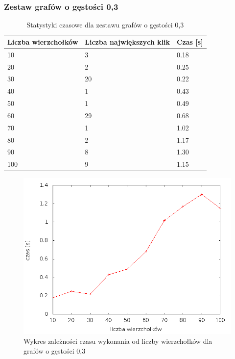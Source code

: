 \documentclass[12pt, a4paper]{article}
\begin{document}
\subsubsection*{Zestaw grafów o gęstości 0,3}
\begin{table}[H]
\caption{Statystyki czasowe dla zestawu grafów o gęstości 0,3}
\begin{center}
    \begin{tabular}{|l|l|l|}
    \hline
    Liczba wierzchołków & Liczba największych klik & Czas [s] \\ \hline
    10 & 3 & 0.18 \\ \hline
    20 & 2 & 0.25 \\ \hline
    30 & 20 & 0.22 \\ \hline
    40 & 1 & 0.43 \\ \hline
    50 & 1 & 0.49 \\ \hline
    60 & 29 & 0.68 \\ \hline
    70 & 1 & 1.02 \\ \hline
    80 & 2 & 1.17 \\ \hline
    90 & 8 & 1.30 \\ \hline
    100 & 9 & 1.15 \\ \hline
    \end{tabular}
\end{center}
\end{table}

\begin{figure}[h]
    \begin{center}
	\includegraphics[scale=0.5]{results/img/den/den_03.png}
	\caption{Wykres zależności czasu wykonania od liczby wierzchołków dla grafów o gęstości 0,3}
    \end{center}
\end{figure}
\end{document}
